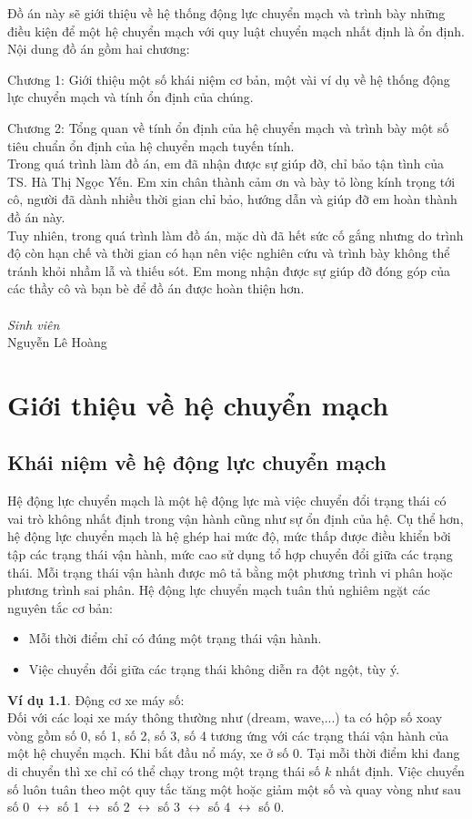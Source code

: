 \documentclass[14pt,a4paper,oneside]{report}		%
\theoremstyle{definition}
\newtheorem{example}[theorem]{Ví dụ}
\begin{document}
Đồ án này sẽ giới thiệu về hệ thống động lực chuyển mạch và trình bày những điều kiện để một hệ chuyển mạch với quy luật chuyển mạch nhất định là ổn định. Nội dung đồ án gồm hai chương:

Chương 1: Giới thiệu một số khái niệm cơ bản, một vài ví dụ về hệ thống động lực chuyển mạch và tính ổn định của chúng.

Chương 2: Tổng quan về tính ổn định của hệ chuyển mạch và trình bày một số tiêu chuẩn ổn định của hệ chuyển mạch tuyến tính.\\

Trong quá trình làm đồ án, em đã nhận được sự giúp đỡ, chỉ bảo tận tình của TS. Hà Thị Ngọc Yến. Em xin chân thành cảm ơn và bày tỏ lòng kính trọng tới cô, người đã dành nhiều thời gian chỉ bảo, hướng dẫn và giúp đỡ em hoàn thành đồ án này.\\
Tuy nhiên, trong quá trình làm đồ án, mặc dù đã hết sức cố gắng nhưng do trình độ còn hạn chế và thời gian có hạn nên việc nghiên cứu và trình bày không thể tránh khỏi nhầm lẫ và thiếu sót. Em mong nhận được sự giúp đỡ đóng góp của các thầy cô và bạn bè để đồ án được hoàn thiện hơn.\\\\
\textit{Sinh viên}\\
Nguyễn Lê Hoàng

\chapter{Giới thiệu về hệ chuyển mạch}
\section{Khái niệm về hệ động lực chuyển mạch}
Hệ động lực chuyển mạch là một hệ động lực mà việc chuyển đổi trạng thái có vai trò không nhất định trong vận hành cũng như sự ổn định của hệ. Cụ thể hơn, hệ động lực chuyển mạch là hệ ghép hai mức độ, mức thấp được điều khiển bởi tập các trạng thái vận hành, mức cao sử dụng tổ hợp chuyển đổi giữa các trạng thái. Mỗi trạng thái vận hành được mô tả bằng một phương trình vi phân hoặc phương trình sai phân. Hệ động lực chuyển mạch tuân thủ nghiêm ngặt các nguyên tắc cơ bản:
\begin{itemize}
  \item Mỗi thời điểm chỉ có đúng một trạng thái vận hành.
  \item Việc chuyển đổi giữa các trạng thái không diễn ra đột ngột, tùy ý.
\end{itemize}
\begin{example}
Động cơ xe máy số:\\
Đối với các loại xe máy thông thường như (dream, wave,...) ta có hộp số xoay vòng gồm số 0, số 1, số 2, số 3, số 4 tương ứng với các trạng thái vận hành của một hệ chuyển mạch. Khi bắt đầu nổ máy, xe ở số 0. Tại mỗi thời điểm khi đang di chuyển thì xe chỉ có thể chạy trong một trạng thái số $k$ nhất định. Việc chuyển số luôn tuân theo một quy tắc tăng một hoặc giảm một số và quay vòng như sau số 0 $\leftrightarrow$ số 1 $\leftrightarrow$ số 2 $\leftrightarrow$ số 3 $\leftrightarrow$ số 4 $\leftrightarrow$ số 0.
\end{example}
\end{document}
